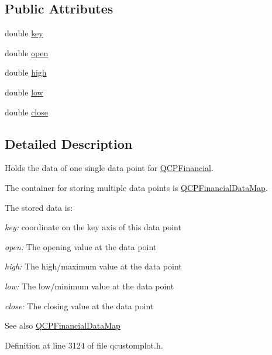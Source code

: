 \subsection*{Public Attributes}
\begin{DoxyCompactItemize}
\item 
double \hyperlink{class_q_c_p_financial_data_a18bc92126f28c214b05b0161e5f5958b}{key}
\item 
double \hyperlink{class_q_c_p_financial_data_a3059e1e1fbcb9fd243fde0450f238032}{open}
\item 
double \hyperlink{class_q_c_p_financial_data_a299a4b241296fb6cd1baf5ab03f7126a}{high}
\item 
double \hyperlink{class_q_c_p_financial_data_aecce0fb45a115e3f3a25eea78491ac16}{low}
\item 
double \hyperlink{class_q_c_p_financial_data_a45e9b96944c4a08ea6c82a72d3d22df2}{close}
\end{DoxyCompactItemize}


\subsection{Detailed Description}
Holds the data of one single data point for \hyperlink{class_q_c_p_financial}{Q\+C\+P\+Financial}. 

The container for storing multiple data points is \hyperlink{qcustomplot_8h_a745c09823fae0974b50beca9bc3b3d7d}{Q\+C\+P\+Financial\+Data\+Map}.

The stored data is\+: \begin{DoxyItemize}
\item {\itshape key\+:} coordinate on the key axis of this data point \item {\itshape open\+:} The opening value at the data point \item {\itshape high\+:} The high/maximum value at the data point \item {\itshape low\+:} The low/minimum value at the data point \item {\itshape close\+:} The closing value at the data point\end{DoxyItemize}
\begin{DoxySeeAlso}{See also}
\hyperlink{qcustomplot_8h_a745c09823fae0974b50beca9bc3b3d7d}{Q\+C\+P\+Financial\+Data\+Map} 
\end{DoxySeeAlso}


Definition at line 3124 of file qcustomplot.\+h.



